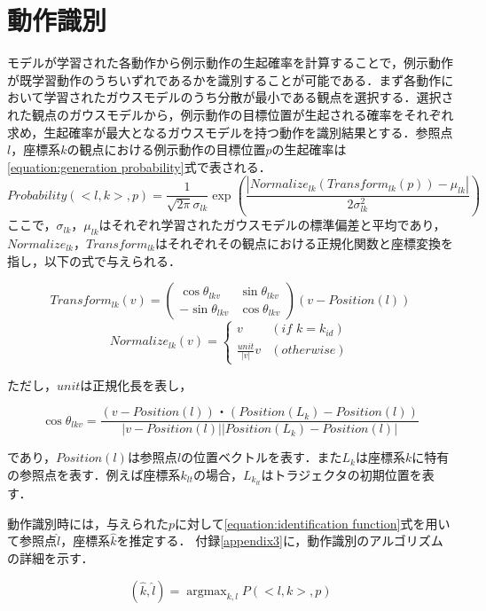 \section{動作識別}

モデルが学習された各動作から例示動作の生起確率を計算することで，例示動作が既学習動作のうちいずれであるかを識別することが可能である．まず各動作において学習されたガウスモデルのうち分散が最小である観点を選択する．選択された観点のガウスモデルから，例示動作の目標位置が生起される確率をそれぞれ求め，生起確率が最大となるガウスモデルを持つ動作を識別結果とする．参照点$l$，座標系$k$の観点における例示動作の目標位置$p$の生起確率は\ref{equation:generation probability}式で表される．
\begin{equation}[h]
	\label{equation:generation probability}
	Probability(<l , k> , p) = \frac{1}{\sqrt{2\pi}σ_{lk}}\exp \left(\frac{|Normalize_{lk}(Transform_{lk}(p))-μ_{lk}|}{2σ_{lk}^2}\right)
\end{equation}
ここで，$σ_{lk}$，$μ_{lk}$はそれぞれ学習されたガウスモデルの標準偏差と平均であり，$Normalize_{lk}$，$Transform_{lk}$はそれぞれその観点における正規化関数と座標変換を指し，以下の式で与えられる．


\[
	Transform_{lk}(v) = 
	\begin{pmatrix}
        	\cos θ_{lkv} & \sin θ_{lkv} \\
        	-\sin θ_{lkv} & \cos θ_{lkv}
	\end{pmatrix}
	(v-Position(l))
\]
\[
	Normalize_{lk}(v) = 
	\begin{cases}
		v & (if\,\,k=k_{id}) \\
		\frac{unit}{|v|}v & (otherwise)
	\end{cases}
\]

ただし，$unit$は正規化長を表し，

\[
	\cos θ_{lkv} = \frac{(v-Position(l))・(Position(L_{k})-Position(l))}{| v-Position(l) || Position(L_{k})-Position(l) |}
\]

であり，$Position(l)$は参照点$l$の位置ベクトルを表す．また$L_{k}$は座標系$k$に特有の参照点を表す．例えば座標系$k_{lt}$の場合，$L_{k_{lt}}$はトラジェクタの初期位置を表す．


動作識別時には，与えられた$p$に対して\ref{equation:identification function}式を用いて参照点$\hat{l}$，座標系$\hat{k}$を推定する．
付録\ref{appendix3}に，動作識別のアルゴリズムの詳細を示す．

\begin{equation}
	\label{equation:identification function}
	(\hat{k} , \hat{l}) =  \mathop{\arg\max}_{k , l}P(<l , k> , p)
\end{equation}


